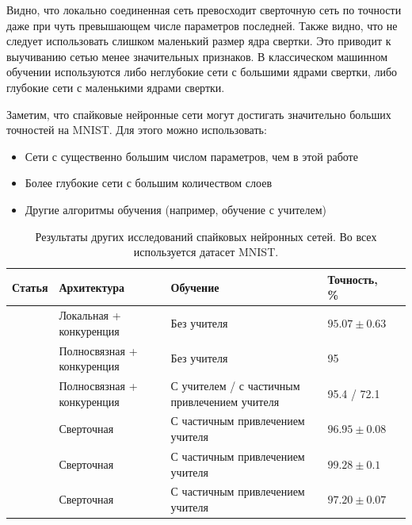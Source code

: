 \documentclass[a4paper]{article}
\begin{document}

Видно, что локально соединенная сеть превосходит сверточную сеть по точности даже при чуть превышающем числе параметров последней. Также видно, что не следует использовать слишком маленький размер ядра свертки. Это приводит к выучиванию сетью менее значительных признаков. В классическом машинном обучении используются либо неглубокие сети с большими ядрами свертки, либо глубокие сети с маленькими ядрами свертки.

Заметим, что спайковые нейронные сети могут достигать значительно больших точностей на MNIST. Для этого можно использовать:
\begin{itemize}
\item Сети с существенно большим числом параметров, чем в этой работе
\item Более глубокие сети с большим количеством слоев
\item Другие алгоритмы обучения (например, обучение с учителем)
\end{itemize} 

\begin{table}[H]
 \caption{Результаты других исследований спайковых нейронных сетей. Во всех используется датасет MNIST.}
\begin{center}
\begin{tabular}{|l|p{4cm}|p{7cm}|l|l|}
\hline
Статья & Архитектура & Обучение & Точность, \% \\
\hline
{\cite{saunders2019locally}} & {Локальная + конкуренция} & {Без учителя} & {$95.07 \pm 0.63$}\\
\hline
{\cite{mnist2}} & {Полносвязная + конкуренция} & {Без учителя} & {95}\\
\hline
{\cite{MaxActiv1}} & {Полносвязная + конкуренция} & {С учителем / с частичным привлечением учителя} & {95.4 / 72.1}\\
\hline
{\cite{conv1}} & {Сверточная} & {С частичным привлечением учителя} & {$96.95 \pm 0.08$}\\
\hline
{\cite{conv2}} & {Сверточная} & {С частичным привлечением учителя} & {$99.28 \pm 0.1$}\\
\hline
{\cite{conv3}} & {Сверточная} & {С частичным привлечением учителя} & {$97.20 \pm 0.07$}\\
\hline
\end{tabular}
\end{center}
\end{table}
\end{document}
